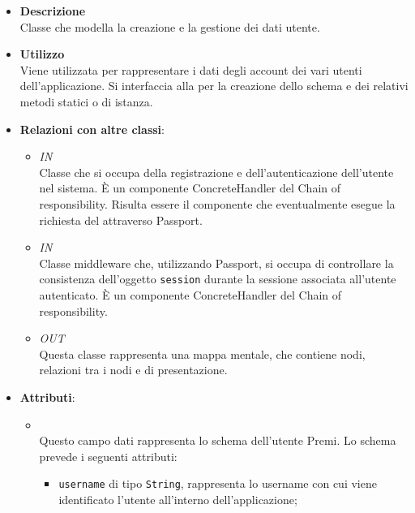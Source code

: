 \begin{itemize}
\item \textbf{Descrizione}\\
Classe che modella la creazione e la gestione dei dati utente.
\item \textbf{Utilizzo}\\
Viene utilizzata per rappresentare i dati degli account dei vari utenti dell'applicazione. Si interfaccia alla   per la creazione dello schema e dei relativi metodi statici o di istanza.
\item \textbf{Relazioni con altre classi}:
\begin{itemize}
\item \textit{IN} \hyperref[\nogloxy{Premi::Back-End::App::Controllers::Users::AuthenticationController}]{}\\
Classe che si occupa della registrazione e dell’autenticazione dell’utente nel sistema. \`E un componente ConcreteHandler del  Chain of responsibility. Risulta essere il componente che eventualmente esegue la richiesta del  attraverso Passport.
\item \textit{IN} \hyperref[\nogloxy{Premi::Back-End::App::Controllers::Users::AuthorizationController}]{}\\
Classe middleware che, utilizzando Passport, si occupa di controllare la consistenza dell'oggetto \texttt{session} durante la sessione associata all'utente autenticato.  \`E un componente ConcreteHandler del  Chain of responsibility.
\item \textit{OUT} \hyperref[\nogloxy{Premi::Back-End::App::Models::ProjectModel}]{}\\
Questa classe rappresenta una mappa mentale, che contiene nodi, relazioni tra i nodi e  di presentazione.
\end{itemize}
\item \textbf{Attributi}:
\begin{itemize}
\item {}
\\ Questo campo dati rappresenta lo schema  dell’utente Premi. Lo schema prevede i seguenti attributi:
\begin{itemize}
\item \texttt{username} di tipo \texttt{String}, rappresenta lo username con cui viene identificato l'utente all'interno dell'applicazione;

\end{itemize}
\end{itemize}
\end{itemize}
